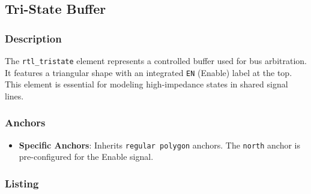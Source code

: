 \subsection{\sffamily Tri-State Buffer}

    \subsubsection{\sffamily Description}
        The \texttt{rtl\_tristate} element represents a controlled buffer used for bus arbitration. It features a triangular shape with an integrated \texttt{EN} (Enable) label at the top. This element is essential for modeling high-impedance states in shared signal lines.

    \subsubsection{\sffamily Anchors}
        \begin{itemize}
            \item \textbf{Specific Anchors}: Inherits \texttt{regular polygon} anchors. The \texttt{north} anchor is pre-configured for the Enable signal.
        \end{itemize}

    \subsubsection{\sffamily Listing}
\begin{RTLexample}
\end{RTLexample}
